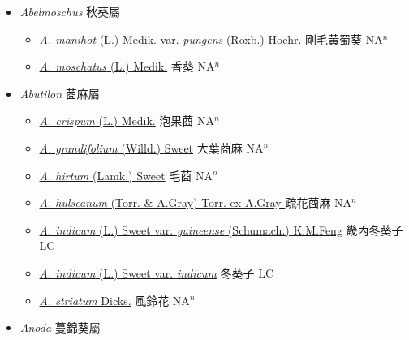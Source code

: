 
  \begin{itemize}
 \item[] \textit{Abelmoschus} 秋葵屬
                    
  \begin{itemize}
        \item[] \href{http://www.theplantlist.org/tpl1.1/search?q=Abelmoschus+manihot+var.+pungens}{\textit{A. manihot} (L.) Medik. var. \textit{pungens} (Roxb.) Hochr.}   剛毛黃蜀葵 NA$^n$
        \item[] \href{http://www.theplantlist.org/tpl1.1/search?q=Abelmoschus+moschatus}{\textit{A. moschatus} (L.) Medik.}   香葵 NA$^n$
  \end{itemize}
 \item[] \textit{Abutilon} 莔麻屬
                    
  \begin{itemize}
        \item[] \href{http://www.theplantlist.org/tpl1.1/search?q=Abutilon+crispum}{\textit{A. crispum} (L.) Medik.}   泡果莔 NA$^n$
        \item[] \href{http://www.theplantlist.org/tpl1.1/search?q=Abutilon+grandifolium}{\textit{A. grandifolium} (Willd.) Sweet}   大葉莔麻 NA$^n$
        \item[] \href{http://www.theplantlist.org/tpl1.1/search?q=Abutilon+hirtum}{\textit{A. hirtum} (Lamk.) Sweet}   毛莔 NA$^n$
        \item[] \href{http://www.theplantlist.org/tpl1.1/search?q=Abutilon+hulseanum}{\textit{A. hulseanum} (Torr. \& A.Gray) Torr. ex A.Gray }   疏花莔麻 NA$^n$
        \item[] \href{http://www.theplantlist.org/tpl1.1/search?q=Abutilon+indicum+var.+guineense}{\textit{A. indicum} (L.) Sweet var. \textit{guineense} (Schumach.) K.M.Feng}   畿內冬葵子 LC
        \item[] \href{http://www.theplantlist.org/tpl1.1/search?q=Abutilon+indicum+var.+indicum}{\textit{A. indicum} (L.) Sweet var. \textit{indicum}}   冬葵子 LC
        \item[] \href{http://www.theplantlist.org/tpl1.1/search?q=Abutilon+striatum}{\textit{A. striatum} Dicks.}   風鈴花 NA$^n$
  \end{itemize}
 \item[] \textit{Anoda} 蔓錦葵屬
                    

\end{itemize}

